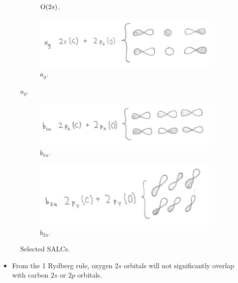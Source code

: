 \documentclass[../notes.tex]{subfiles}
\begin{document}
\begin{itemize}
\begin{enumerate}
\begin{figure}[H]
\begin{subfigure}[b]{0.49\linewidth}
                \caption{$\ce{O}(2s)$.}
                \label{fig:CO2SALCa}
            \end{subfigure}
            \begin{subfigure}[b]{0.49\linewidth}
                \centering
                \includegraphics[width=0.8\linewidth]{../ExtFiles/CO2SALCb.png}
                \caption{$a_g$.}
                \label{fig:CO2SALCb}
            \end{subfigure}
        \end{figure}
        \begin{figure}[H]
            \ContinuedFloat
            \centering
            \begin{subfigure}[b]{0.49\linewidth}
                \centering
                \includegraphics[width=0.8\linewidth]{../ExtFiles/CO2SALCc.png}
                \caption{$b_{1u}$.}
                \label{fig:CO2SALCc}
            \end{subfigure}
            \begin{subfigure}[b]{0.49\linewidth}
                \centering
                \includegraphics[width=0.8\linewidth]{../ExtFiles/CO2SALCd.png}
                \caption{$b_{2u}$.}
                \label{fig:CO2SALCd}
            \end{subfigure}
            \caption{Selected  SALCs.}
            \label{fig:CO2SALC}
        \end{figure}
        \begin{itemize}
            \item From the 1 Rydberg rule, oxygen $2s$ orbitals will not significantly overlap with carbon $2s$ or $2p$ orbitals.

\end{itemize}
\end{enumerate}
\end{itemize}
\end{document}
